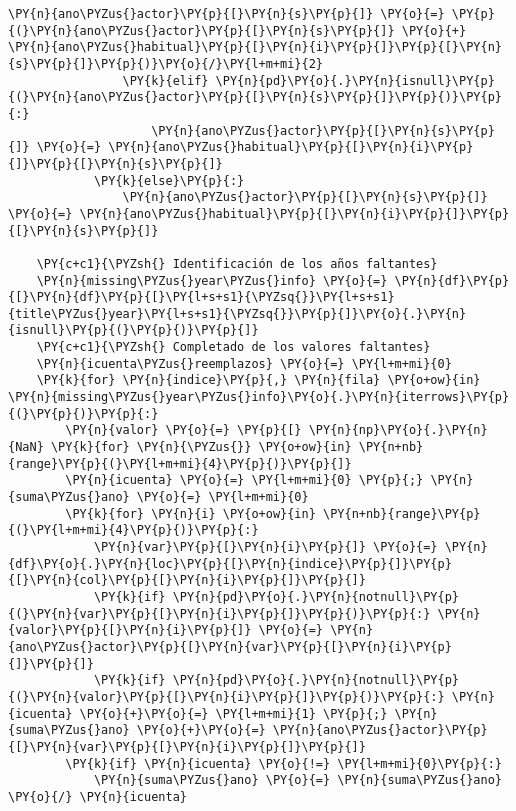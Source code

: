\begin{tcolorbox}[breakable, size=fbox, boxrule=1pt, pad at break*=1mm,colback=cellbackground, colframe=cellborder]
\begin{Verbatim}[commandchars=\\\{\}]
                    \PY{n}{ano\PYZus{}actor}\PY{p}{[}\PY{n}{s}\PY{p}{]} \PY{o}{=} \PY{p}{(}\PY{n}{ano\PYZus{}actor}\PY{p}{[}\PY{n}{s}\PY{p}{]} \PY{o}{+} \PY{n}{ano\PYZus{}habitual}\PY{p}{[}\PY{n}{i}\PY{p}{]}\PY{p}{[}\PY{n}{s}\PY{p}{]}\PY{p}{)}\PY{o}{/}\PY{l+m+mi}{2}
                \PY{k}{elif} \PY{n}{pd}\PY{o}{.}\PY{n}{isnull}\PY{p}{(}\PY{n}{ano\PYZus{}actor}\PY{p}{[}\PY{n}{s}\PY{p}{]}\PY{p}{)}\PY{p}{:}
                    \PY{n}{ano\PYZus{}actor}\PY{p}{[}\PY{n}{s}\PY{p}{]} \PY{o}{=} \PY{n}{ano\PYZus{}habitual}\PY{p}{[}\PY{n}{i}\PY{p}{]}\PY{p}{[}\PY{n}{s}\PY{p}{]}
            \PY{k}{else}\PY{p}{:}
                \PY{n}{ano\PYZus{}actor}\PY{p}{[}\PY{n}{s}\PY{p}{]} \PY{o}{=} \PY{n}{ano\PYZus{}habitual}\PY{p}{[}\PY{n}{i}\PY{p}{]}\PY{p}{[}\PY{n}{s}\PY{p}{]}
        
    \PY{c+c1}{\PYZsh{} Identificación de los años faltantes}
    \PY{n}{missing\PYZus{}year\PYZus{}info} \PY{o}{=} \PY{n}{df}\PY{p}{[}\PY{n}{df}\PY{p}{[}\PY{l+s+s1}{\PYZsq{}}\PY{l+s+s1}{title\PYZus{}year}\PY{l+s+s1}{\PYZsq{}}\PY{p}{]}\PY{o}{.}\PY{n}{isnull}\PY{p}{(}\PY{p}{)}\PY{p}{]}
    \PY{c+c1}{\PYZsh{} Completado de los valores faltantes}
    \PY{n}{icuenta\PYZus{}reemplazos} \PY{o}{=} \PY{l+m+mi}{0}
    \PY{k}{for} \PY{n}{indice}\PY{p}{,} \PY{n}{fila} \PY{o+ow}{in} \PY{n}{missing\PYZus{}year\PYZus{}info}\PY{o}{.}\PY{n}{iterrows}\PY{p}{(}\PY{p}{)}\PY{p}{:}
        \PY{n}{valor} \PY{o}{=} \PY{p}{[} \PY{n}{np}\PY{o}{.}\PY{n}{NaN} \PY{k}{for} \PY{n}{\PYZus{}} \PY{o+ow}{in} \PY{n+nb}{range}\PY{p}{(}\PY{l+m+mi}{4}\PY{p}{)}\PY{p}{]}
        \PY{n}{icuenta} \PY{o}{=} \PY{l+m+mi}{0} \PY{p}{;} \PY{n}{suma\PYZus{}ano} \PY{o}{=} \PY{l+m+mi}{0}
        \PY{k}{for} \PY{n}{i} \PY{o+ow}{in} \PY{n+nb}{range}\PY{p}{(}\PY{l+m+mi}{4}\PY{p}{)}\PY{p}{:}            
            \PY{n}{var}\PY{p}{[}\PY{n}{i}\PY{p}{]} \PY{o}{=} \PY{n}{df}\PY{o}{.}\PY{n}{loc}\PY{p}{[}\PY{n}{indice}\PY{p}{]}\PY{p}{[}\PY{n}{col}\PY{p}{[}\PY{n}{i}\PY{p}{]}\PY{p}{]}
            \PY{k}{if} \PY{n}{pd}\PY{o}{.}\PY{n}{notnull}\PY{p}{(}\PY{n}{var}\PY{p}{[}\PY{n}{i}\PY{p}{]}\PY{p}{)}\PY{p}{:} \PY{n}{valor}\PY{p}{[}\PY{n}{i}\PY{p}{]} \PY{o}{=} \PY{n}{ano\PYZus{}actor}\PY{p}{[}\PY{n}{var}\PY{p}{[}\PY{n}{i}\PY{p}{]}\PY{p}{]}
            \PY{k}{if} \PY{n}{pd}\PY{o}{.}\PY{n}{notnull}\PY{p}{(}\PY{n}{valor}\PY{p}{[}\PY{n}{i}\PY{p}{]}\PY{p}{)}\PY{p}{:} \PY{n}{icuenta} \PY{o}{+}\PY{o}{=} \PY{l+m+mi}{1} \PY{p}{;} \PY{n}{suma\PYZus{}ano} \PY{o}{+}\PY{o}{=} \PY{n}{ano\PYZus{}actor}\PY{p}{[}\PY{n}{var}\PY{p}{[}\PY{n}{i}\PY{p}{]}\PY{p}{]}
        \PY{k}{if} \PY{n}{icuenta} \PY{o}{!=} \PY{l+m+mi}{0}\PY{p}{:} 
            \PY{n}{suma\PYZus{}ano} \PY{o}{=} \PY{n}{suma\PYZus{}ano} \PY{o}{/} \PY{n}{icuenta} 


\end{Verbatim}
\end{tcolorbox}
